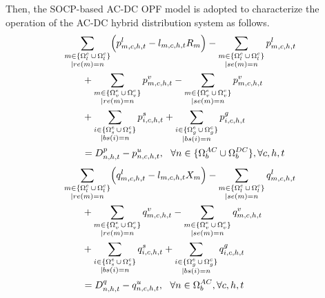 \documentclass[a4paper,fleqn]{cas-dc}
\begin{document}
Then, the SOCP-based AC-DC OPF model \cite{Ergun_2019_Optimal,Wu_2018_bi-level}
is adopted to characterize the operation of the AC-DC hybrid distribution 
system as follows.
\begin{align}
    \label{p_balance}
    \begin{aligned}
        & 
        \sum_{\substack{m \in \{\Omega_{l}^{e} \, \cup \, \Omega_{l}^{c}\} \\ 
        | re(m) = n}} \Bigl( p_{m,c,h,t}^{l} - l_{m,c,h,t} R_{m} \Bigr) - 
        \sum_{\substack{m \in \{\Omega_{l}^{e} \, \cup \, \Omega_{l}^{c}\} \\ 
        | se(m) = n}} p_{m,c,h,t}^{l} \\
        & \quad \quad +
        \sum_{\substack{m \in \{\Omega_{v}^{e} \, \cup \, \Omega_{v}^{c}\} \\ 
        | re(m) = n}} p_{m,c,h,t}^{v} - 
        \sum_{\substack{m \in \{\Omega_{v}^{e} \, \cup \, \Omega_{v}^{c}\} \\ 
        | se(m) = n}} p_{m,c,h,t}^{v} \\
        & \quad \quad +
        \sum_{\substack{i \in \{\Omega_{s}^{e} \, \cup \, \Omega_{s}^{c}\} \\
        | bs(i) = n}} p_{i,c,h,t}^{s} + 
        \sum_{\substack{i \in \{\Omega_{g}^{e} \, \cup \, \Omega_{g}^{c}\} \\
        | bs(i) = n}} p_{i,c,h,t}^{g} \\
        & \quad \quad = 
        D_{n,h,t}^{p} - p_{n,c,h,t}^{u}, 
        \ \ \forall n \in \{\Omega_{b}^{AC} \cup \Omega_{b}^{DC}\},
        \forall c,h,t
    \end{aligned}
\end{align}
\begin{align}
    \label{q_balance}
    \begin{aligned}
        & 
        \sum_{\substack{m \in \{\Omega_{l}^{e} \, \cup \, \Omega_{l}^{c}\} \\ 
        | re(m) = n}} \Bigl( q_{m,c,h,t}^{l} - l_{m,c,h,t} X_{m} \Bigr) - 
        \sum_{\substack{m \in \{\Omega_{l}^{e} \, \cup \, \Omega_{l}^{c}\} \\ 
        | se(m) = n}} q_{m,c,h,t}^{l} \\
        & \quad \quad +
        \sum_{\substack{m \in \{\Omega_{v}^{e} \, \cup \, \Omega_{v}^{c}\} \\ 
        | re(m) = n}} q_{m,c,h,t}^{v} - 
        \sum_{\substack{m \in \{\Omega_{v}^{e} \, \cup \, \Omega_{v}^{c}\} \\ 
        | se(m) = n}} q_{m,c,h,t}^{v} \\
        & \quad \quad +
        \sum_{\substack{i \in \{\Omega_{s}^{e} \, \cup \, \Omega_{s}^{c}\} \\
        | bs(i) = n}} q_{i,c,h,t}^{s} + 
        \sum_{\substack{i \in \{\Omega_{g}^{e} \, \cup \, \Omega_{g}^{c}\} \\
        | bs(i) = n}} q_{i,c,h,t}^{g} \\
        & \quad \quad = 
        D_{n,h,t}^{q} - q_{n,c,h,t}^{u}, 
        \ \ \forall n \in \Omega_{b}^{AC},
        \forall c,h,t
    \end{aligned}
\end{align}
\end{document}
